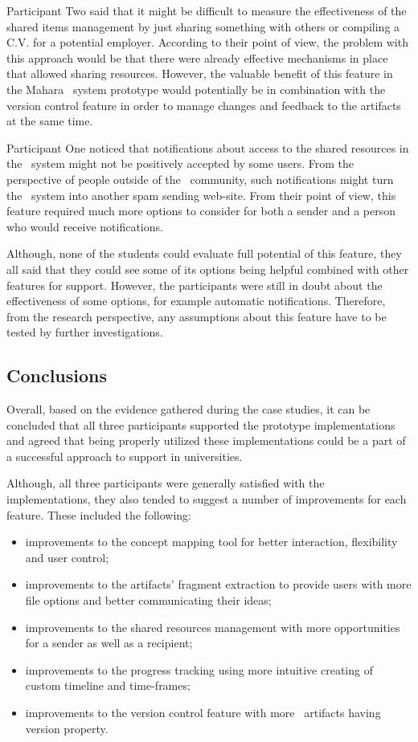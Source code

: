 Participant Two said that it might be difficult to measure the effectiveness
of the shared items management by just sharing something with others or
compiling a C.V. for a potential employer. According to their point of view, the
problem with this approach would be that there were already effective mechanisms
in place that allowed sharing resources. However, the valuable benefit of this
feature in the Mahara \ep~system prototype would potentially be in combination
with the version control feature in order to manage changes and feedback to the
artifacts at the same time.

Participant One noticed that notifications about access to the shared resources
in the \ep~system might not be positively accepted by some users. From the
perspective of people outside of the \ep~community, such notifications might
turn the \ep~system into another spam sending web-site. From their point of
view, this feature required much more options to consider for both a sender and
a person who would receive notifications.

Although, none of the students could evaluate full potential of this feature,
they all said that they could see some of its options being helpful combined
with other features for \LLLs support. However, the participants were still in
doubt about the effectiveness of some options, for example automatic
notifications. Therefore, from the research perspective, any assumptions about
this feature have to be tested by further investigations.

\subsection{Conclusions}

Overall, based on the evidence gathered during the case studies, it can be
concluded that all three participants supported the prototype implementations
and agreed that being properly utilized these implementations could be a part of
a successful approach to \LLLs support in universities.

Although, all three participants were generally satisfied with the
implementations, they also tended to suggest a number of improvements for each
feature. These included the following:

\begin{itemize}
  \item improvements to the concept mapping tool for better interaction,
  flexibility and user control;
  \item improvements to the artifacts' fragment extraction to provide users with
  more file options and better communicating their ideas;
  \item improvements to the shared resources management with more opportunities
  for a sender as well as a recipient; 
  \item improvements to the progress tracking using more intuitive creating of
  custom timeline and time-frames;
  \item improvements to the version control feature with more \ep~artifacts
  having version property.
\end{itemize}

